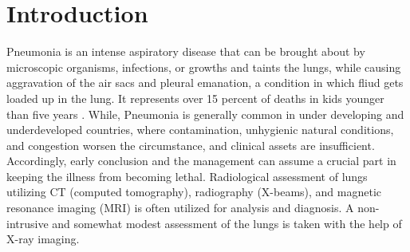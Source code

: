 \documentclass{ieeeaccess}
\begin{document}
\section{Introduction}
Pneumonia is an intense aspiratory disease that can be brought about by microscopic organisms, infections, or growths and taints the lungs, while causing aggravation of the air sacs and pleural emanation, a condition in which fliud gets loaded up in the lung. It represents over 15 percent of deaths in kids younger than five years \cite{b1}. While, Pneumonia is generally common in under developing and underdeveloped countries, where contamination, unhygienic natural conditions, and congestion worsen the circumstance, and clinical assets are insufficient. Accordingly, early conclusion and the management can assume a crucial part in keeping the illness from becoming lethal. Radiological assessment of lungs utilizing CT (computed tomography), radiography (X-beams), and magnetic resonance imaging (MRI) is often utilized for analysis and diagnosis. A non-intrusive and somewhat modest assessment of the lungs is taken with the help of  X-ray imaging.
\end{document}
